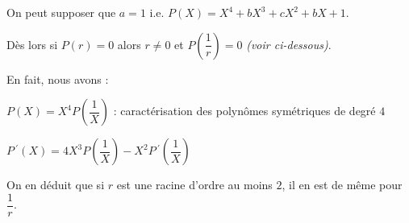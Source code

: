 On peut supposer que $a = 1$ i.e. $P(X) = X^4 + b X^3 + c X^2 + b X + 1$.

Dès lors si $P(r) = 0$ alors $r \neq 0$ et $P\left( \dfrac1r \right) = 0$ \emph{(voir ci-dessous)}.

En fait, nous avons :

\medskip

$P(X) = X^4 P\left( \dfrac1X \right)$ : caractérisation des polynômes symétriques de degré $4$

\medskip

$P\,^{\prime}(X) = 4 X^3 P\left( \dfrac1X \right) 
            - X^2 P\,^{\prime}\left( \dfrac1X \right)$

%
%

On en déduit que si $r$ est une racine d'ordre au moins $2$, il en est de même pour $\dfrac1r$.
